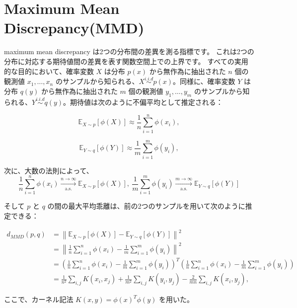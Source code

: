 \documentclass[dvipdfmx,a4paper]{jsarticle}%
\begin{document}
\section{\textbf{Maximum Mean Discrepancy(MMD)}}
\begin{dfn}\label{def:mmd}
  maximum mean discrepancy は2つの分布間の差異を測る指標です。 これは2つの分布に対応する期待値間の差異を表す関数空間上での上界です。
すべての実用的な目的において、確率変数 $X$ は分布 $p(x)$ から無作為に抽出された $n$ 個の観測値 $x_1, \ldots, x_n$ のサンプルから知られる、$X\stackrel{i.i.d}{\sim}p(x)$。同様に、確率変数 $Y$ は分布 $q(y)$ から無作為に抽出された $m$ 個の観測値 $y_1, \ldots, y_m$ のサンプルから知られる、$Y\stackrel{i.i.d}{\sim}q(y)$。期待値は次のように不偏平均として推定される：

$$\mathbb{E}_{X \sim p}[\phi(X)] \approx \frac{1}{n} \sum_{i=1}^n \phi(x_i),$$

$$\mathbb{E}_{Y \sim q}[\phi(Y)] \approx \frac{1}{m} \sum_{i=1}^m \phi(y_i),$$

次に、大数の法則によって、
 $$ \frac{1}{n} \sum_{i=1}^{n} \phi(x_i) \xrightarrow[\text{a.s.}]{n \to \infty} \mathbb{E}_{X \sim p}[\phi(X)],\ \frac{1}{m} \sum_{i=1}^{m} \phi(y_i) \xrightarrow[\text{a.s.}]{m \to \infty} \mathbb{E}_{Y \sim q}[\phi(Y)] $$

そして $p$ と $q$ の間の最大平均乖離は、前の2つのサンプルを用いて次のように推定できる：

\begin{align*}
d_{MMD}(p, q) &= \left\|\mathbb{E}_{X \sim p}[\phi(X)] - \mathbb{E}_{Y \sim q}[\phi(Y)]\right\|^2 \\
&= \left\|\frac{1}{n} \sum_{i=1}^n \phi(x_i) - \frac{1}{m} \sum_{i=1}^m \phi(y_i)\right\|^2 \\
&= \left(\frac{1}{n} \sum_{i=1}^n \phi(x_i) - \frac{1}{m} \sum_{i=1}^m \phi(y_i)\right)^T \left(\frac{1}{n} \sum_{i=1}^n \phi(x_i) - \frac{1}{m} \sum_{i=1}^m \phi(y_i)\right) \\
&= \frac{1}{n^2} \sum_{i,j} K(x_i, x_j) + \frac{1}{m^2} \sum_{i,j} K(y_i, y_j) - \frac{2}{mn} \sum_{i,j} K(x_i, y_j), 
\end{align*}

ここで、カーネル記法 $K(x, y) = \phi(x)^T \phi(y)$ を用いた。
\end{dfn}
\appendix

\end{document}
